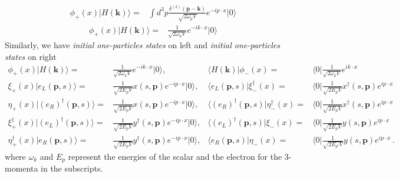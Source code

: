 \begin{frame}
\begin{align}
\phi_+(x)|H(\mathbf{k})\rangle  
=&\int d^3p \frac{\delta^{(3)}(\mathbf{p}-\mathbf{k})}{\sqrt{2\omega_{p}V}}
 e^{-i p\cdot x }|0\rangle
\end{align}
\begin{align}
\phi_+(x)|H(\mathbf{k})\rangle  
=&\frac{1}{\sqrt{2\omega_{k}V}}e^{-i k\cdot x }|0\rangle
\end{align}
Similarly, we have  \emph{initial one-particles states} on left and \emph{initial one-particles states} on right
\begin{align}
  \label{eq:99f}
  \phi_+(x)|H(\mathbf{k})\rangle=&\frac{1}{\sqrt{2 \omega_k V}}e^{-i k\cdot x}|0\rangle,&
 \langle H(\mathbf{k})|\phi_-(x)=&\langle0|\frac{1}{\sqrt{2 \omega_k V}}e^{i k\cdot x}\nonumber\\
  \xi_+(x)|e_{L}(\mathbf{p},s)\rangle=&\frac{1}{\sqrt{2 E_p V}}x(s,\mathbf{p})e^{-i p\cdot x}|0\rangle,&
  \langle e_{L}(\mathbf{p},s)|\xi_-^{\dagger}(x)=&\langle 0|\frac{1}{\sqrt{2 E_p V}}x^{\dagger}(s,\mathbf{p})e^{i p\cdot x}\nonumber\\
  \eta_+(x)|\left( e_R \right)^{\dagger}(\mathbf{p},s)\rangle=&\frac{1}{\sqrt{2 E_{p} V}}x(s,\mathbf{p})e^{-i p\cdot x}|0\rangle,&
  \langle \left( e_R \right)^{\dagger}(\mathbf{p},s)|\eta^{\dagger}_-(x)=&\langle 0|\frac{1}{\sqrt{2 E_{p} V}}x^{\dagger}(s,\mathbf{p})e^{i p\cdot x} \nonumber\\
  \xi_+^{\dagger}(x)|\left( e_{L} \right)^{\dagger}(\mathbf{p},s)\rangle=&\frac{1}{\sqrt{2 E_p V}}y^{\dagger}(s,\mathbf{p})e^{-i p\cdot x}|0\rangle,&
  \langle\left( e_{L} \right)^{\dagger}(\mathbf{p},s)|\xi_-(x)=&\langle 0| \frac{1}{\sqrt{2 E_p V}}y(s,\mathbf{p})e^{i p\cdot x}\nonumber\\
  \eta_+^{\dagger}(x)|e_R (\mathbf{p},s)\rangle=&\frac{1}{\sqrt{2 E_{p} V}}y^{\dagger}(s,\mathbf{p})e^{-i p\cdot x}|0\rangle,&
  \langle e_R(\mathbf{p},s)|\eta_-(x)=&\langle 0|\frac{1}{\sqrt{2 E_{p'} V}}y(s,\mathbf{p})e^{i p\cdot x}
 \,.
\end{align}
where $\omega_k$ and $E_p$ represent the energies of the scalar and the electron for the 3-momenta in the subscripts.


\end{frame}
